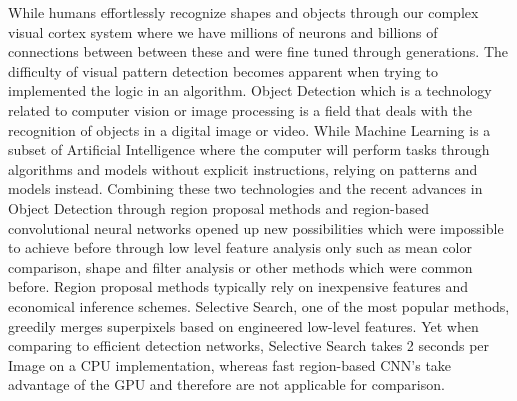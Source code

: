 
While humans effortlessly recognize shapes and objects through our complex visual cortex system where we have millions of neurons and
billions of connections between between these and were fine tuned through generations. The difficulty of visual pattern detection becomes
apparent when trying to implemented the logic in an algorithm.\cite{neuralnetworksanddeeplearning} 
\newline
\newline
Object Detection which is a technology related to computer vision or image processing is a field that deals with the recognition of objects in a digital image or video.
\newline
While Machine Learning is a subset of Artificial Intelligence where the computer will perform tasks through algorithms and models without explicit instructions, relying on patterns  and models instead.
\newline
\newline
Combining these two technologies and the recent advances in Object Detection through region proposal methods and region-based convolutional
neural networks opened up new possibilities which were impossible to achieve before through low level feature analysis only such as mean color comparison, shape and filter analysis or other methods which were common before.
\newline
\newline
Region proposal methods typically rely on inexpensive features and economical inference schemes. Selective Search, one of the most popular
methods, greedily merges superpixels based on engineered low-level features. Yet when comparing to efficient detection networks, Selective
Search takes 2 seconds per Image on a CPU implementation, whereas fast region-based CNN's take advantage of the GPU and therefore are not applicable for comparison.\cite{fasterrcnn}
\newline

